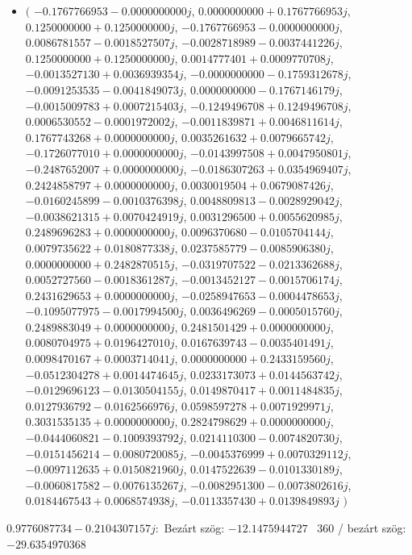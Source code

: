 \documentclass[14pt,a4paper]{article}
\begin{document}
\begin{itemize}
\item
$\big($
$-0.1767766953-0.0000000000j$, $0.0000000000+0.1767766953j$, $0.1250000000+0.1250000000j$, $-0.1767766953-0.0000000000j$, $0.0086781557-0.0018527507j$, $-0.0028718989-0.0037441226j$, $0.1250000000+0.1250000000j$, $0.0014777401+0.0009770708j$, $-0.0013527130+0.0036939354j$, $-0.0000000000-0.1759312678j$, $-0.0091253535-0.0041849073j$, $0.0000000000-0.1767146179j$, $-0.0015009783+0.0007215403j$, $-0.1249496708+0.1249496708j$, $0.0006530552-0.0001972002j$, $-0.0011839871+0.0046811614j$, $0.1767743268+0.0000000000j$, $0.0035261632+0.0079665742j$, $-0.1726077010+0.0000000000j$, $-0.0143997508+0.0047950801j$, $-0.2487652007+0.0000000000j$, $-0.0186307263+0.0354969407j$, $0.2424858797+0.0000000000j$, $0.0030019504+0.0679087426j$, $-0.0160245899-0.0010376398j$, $0.0048809813-0.0028929042j$, $-0.0038621315+0.0070424919j$, $0.0031296500+0.0055620985j$, $0.2489696283+0.0000000000j$, $0.0096370680-0.0105704144j$, $0.0079735622+0.0180877338j$, $0.0237585779-0.0085906380j$, $0.0000000000+0.2482870515j$, $-0.0319707522-0.0213362688j$, $0.0052727560-0.0018361287j$, $-0.0013452127-0.0015706174j$, $0.2431629653+0.0000000000j$, $-0.0258947653-0.0004478653j$, $-0.1095077975-0.0017994500j$, $0.0036496269-0.0005015760j$, $0.2489883049+0.0000000000j$, $0.2481501429+0.0000000000j$, $0.0080704975+0.0196427010j$, $0.0167639743-0.0035401491j$, $0.0098470167+0.0003714041j$, $0.0000000000+0.2433159560j$, $-0.0512304278+0.0014474645j$, $0.0233173073+0.0144563742j$, $-0.0129696123-0.0130504155j$, $0.0149870417+0.0011484835j$, $0.0127936792-0.0162566976j$, $0.0598597278+0.0071929971j$, $0.3031535135+0.0000000000j$, $0.2824798629+0.0000000000j$, $-0.0444060821-0.1009393792j$, $0.0214110300-0.0074820730j$, $-0.0151456214-0.0080720085j$, $-0.0045376999+0.0070329112j$, $-0.0097112635+0.0150821960j$, $0.0147522639-0.0101330189j$, $-0.0060817582-0.0076135267j$, $-0.0082951300-0.0073802616j$, $0.0184467543+0.0068574938j$, $-0.0113357430+0.0139849893j$
$\big)$
\end{itemize}
$0.9776087734-0.2104307157j$:\
Bezárt szög: $-12.1475944727$ \
360 / bezárt szög: $-29.6354970368$\
\end{document}
